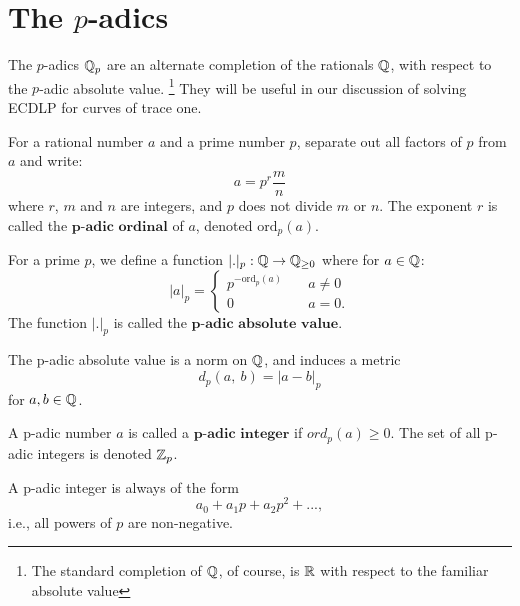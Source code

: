 \label{sec:p-adics}
\section{The $p$-adics}

The $p$-adics $\mathbb{Q}_p$ are an alternate completion of the rationals $\mathbb{Q}$, with respect to the $p$-adic absolute value.
\footnote{The standard completion of $\mathbb{Q}$, of course, is $\mathbb{R}$ with respect
to the familiar absolute value} They will be useful in our discussion of solving ECDLP for curves of trace one.
\begin{defn}
For a rational number $a$ and a prime number $p$, separate out all factors of $p$ from $a$ and write: $$ a = p^r \dfrac{m}{n} $$ where $r$, $m$ and $n$ are integers, and $p$ does not divide $m$ or $n$. The exponent $r$ is called the $\textbf{p-adic ordinal}$ of $a$, denoted $\text{ord}_p(a)$.
\end{defn}

\begin{defn}
For a prime $p$, we define a function $|.|_p : \mathbb{Q} \to \mathbb{Q}_{\ge 0}$ where for $a \in \mathbb{Q}$:
$$
|a|_p = \left\{
        \begin{array}{ll}
            p^{-\text{ord}_p(a)} & \quad a \neq 0 \\
            0 & \quad a = 0.
        \end{array}
    \right.
$$
The function $|.|_p$ is called the $\textbf{p-adic absolute value}$.
\end{defn}

\begin{prop}
The p-adic absolute value is a norm on $\mathbb{Q}$, and induces a metric $$d_p(a, \ b) = | a - b |_p$$ for $a, b \in \mathbb{Q}$.
\end{prop}

\begin{pf}
\end{pf}


\begin{defn}
A p-adic number $a$ is called a $\textbf{p-adic integer}$ if $ord_p(a) \ge 0$. The set of all p-adic integers is
denoted $\mathbb{Z}_p$.
\end{defn}

\begin{rmk}
A p-adic integer is always of the form $$a_0 + a_1p + a_2p^2 + ... ,$$ i.e., all powers of $p$ are non-negative.
\end{rmk}

